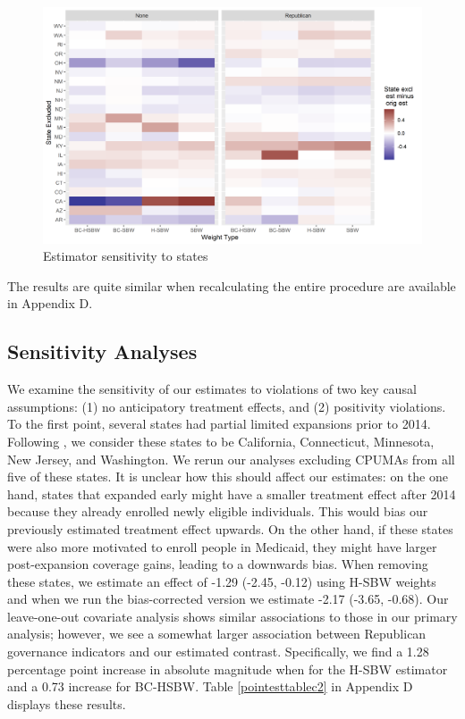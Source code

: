 \documentclass[12pt]{article}
\begin{document}
\begin{figure}[]
\begin{center}
    \includegraphics[scale=0.6]{01_Plots/c1-loostate-sensitivity.png}
    \caption{Estimator sensitivity to states}
    \label{loostateplot}
\end{center}
\end{figure}

The results are quite similar when recalculating the entire procedure are available in Appendix D. 

\subsection{Sensitivity Analyses}

We examine the sensitivity of our estimates to violations of two key causal assumptions: (1) no anticipatory treatment effects, and (2) positivity violations. To the first point, several states had partial limited expansions prior to 2014. Following \cite{frean2017premium}, we consider these states to be California, Connecticut, Minnesota, New Jersey, and Washington. We rerun our analyses excluding CPUMAs from all five of these states. It is unclear how this should affect our estimates: on the one hand, states that expanded early might have a smaller treatment effect after 2014 because they already enrolled newly eligible individuals. This would bias our previously estimated treatment effect upwards. On the other hand, if these states were also more motivated to enroll people in Medicaid, they might have larger post-expansion coverage gains, leading to a downwards bias. When removing these states, we estimate an effect of -1.29 (-2.45, -0.12) using H-SBW weights and when we run the bias-corrected version we estimate -2.17 (-3.65, -0.68). Our leave-one-out covariate analysis shows similar associations to those in our primary analysis; however, we see a somewhat larger association between Republican governance indicators and our estimated contrast. Specifically, we find a 1.28 percentage point increase in absolute magnitude when for the H-SBW estimator and a 0.73 increase for BC-HSBW. Table \ref{pointesttablec2} in Appendix D displays these results. 
\end{document}
